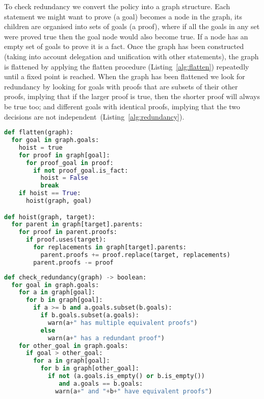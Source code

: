 \documentclass[a4paper]{article}
\begin{document}
To check redundancy we convert the policy into a graph structure.
Each statement we might want to prove (a goal) becomes a node in the graph, its children are organised into sets of goals (a proof), where if all the goals in any set were proved true then the goal node would also become true.
If a node has an empty set of goals to prove it is a fact.
Once the graph has been constructed (taking into account delegation and unification with other statements), the graph is flattened by applying the flatten procedure (Listing~\ref{alg:flatten}) repeatedly until a fixed point is reached.
When the graph has been flattened we look for redundancy by looking for goals with proofs that are subsets of their other proofs, implying that if the larger proof is true, then the shorter proof will always be true too; 
  and different goals with identical proofs, implying that the two decisions are not independent~(Listing~\ref{alg:redundancy}).

\begin{lstlisting}[language=Python,float,caption={Procedure for flattening the redundancy graph.},label={alg:flatten}]
def flatten(graph):
  for goal in graph.goals:
    hoist = true
    for proof in graph[goal]:
      for proof_goal in proof:
        if not proof_goal.is_fact:
          hoist = False
          break
    if hoist == True:
      hoist(graph, goal)

def hoist(graph, target):
  for parent in graph[target].parents:
    for proof in parent.proofs:
      if proof.uses(target):
        for replacements in graph[target].parents:
          parent.proofs += proof.replace(target, replacements)
        parent.proofs -= proof
\end{lstlisting}

\begin{lstlisting}[language=Python,float,caption={Procedure to check for redundancy.},label={alg:redundancy}]
def check_redundancy(graph) -> boolean:
  for goal in graph.goals:
    for a in graph[goal]:
      for b in graph[goal]:
        if a >= b and a.goals.subset(b.goals):
          if b.goals.subset(a.goals):
            warn(a+" has multiple equivalent proofs") 
          else
            warn(a+" has a redundant proof")
    for other_goal in graph.goals:
      if goal > other_goal:
        for a in graph[goal]:
          for b in graph[other_goal]:
            if not (a.goals.is_empty() or b.is_empty())
               and a.goals == b.goals:
              warn(a+" and "+b+" have equivalent proofs")
\end{lstlisting}
\end{document}
